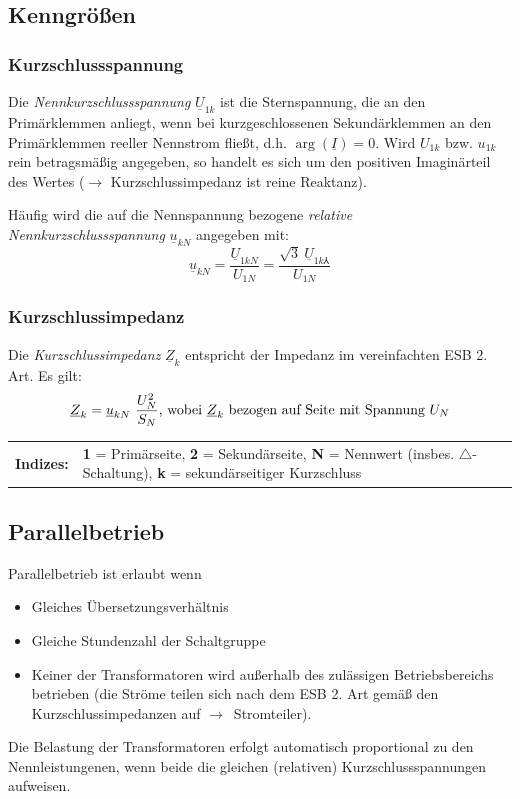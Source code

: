 \documentclass[11pt]{article}
\begin{document}
\subsection*{Kenngrößen}
\subsubsection*{Kurzschlussspannung}
Die \textit{Nennkurzschlussspannung} $\underline U_{1k}$ ist die Sternspannung, die an den Primärklemmen anliegt, wenn bei kurzgeschlossenen Sekundärklemmen an den Primärklemmen reeller Nennstrom fließt, d.h. $\arg(\underline I) = 0$. Wird $U_{1k}$ bzw. $u_{1k}$ rein betragsmäßig angegeben, so handelt es sich um den positiven Imaginärteil des Wertes ($\rightarrow$ Kurzschlussimpedanz ist reine Reaktanz).

\vspace{.5em}
Häufig wird die auf die Nennspannung bezogene \textit{relative Nennkurzschlussspannung} $\underline u_{kN}$ angegeben mit:
\[
	\underline u_{kN} = \frac{\underline U_{1kN}}{U_{1N}} = \frac{\sqrt{3} ~ \underline U_{1k\Yup}}{U_{1N}}
\]

\subsubsection*{Kurzschlussimpedanz}
Die \textit{Kurzschlussimpedanz} $\underline Z_k$ entspricht der Impedanz im vereinfachten ESB 2. Art. Es gilt:
\[
	\underline Z_k = \underline u_{kN} ~ \frac{U_N^2}{S_N} \textnormal{, wobei $\underline Z_k$ bezogen auf Seite mit Spannung $U_N$}
\]

\raggedright
\vspace{12pt}
\footnotesize
\begin{tabular}{r p{13cm}}
	\sffamily\textbf{Indizes:} & \rmfamily \textbf{1} = Primärseite, \textbf{2} = Sekundärseite, \textbf{N} = Nennwert (insbes. $\triangle$-Schaltung), \textbf{k} = sekundärseitiger Kurzschluss
\end{tabular}
\normalsize

\subsection*{Parallelbetrieb}
\rmfamily
Parallelbetrieb ist erlaubt wenn
\begin{itemize}
\item Gleiches Übersetzungsverhältnis
\item Gleiche Stundenzahl der Schaltgruppe
\item Keiner der Transformatoren wird außerhalb des zulässigen Betriebsbereichs betrieben (die Ströme teilen sich nach dem ESB 2. Art gemäß den Kurzschlussimpedanzen auf \mbox{$\rightarrow$ Stromteiler}).
\end{itemize}
Die Belastung der Transformatoren erfolgt automatisch proportional zu den Nennleistungenen, wenn beide die gleichen (relativen) Kurzschlussspannungen aufweisen.
\end{document}
